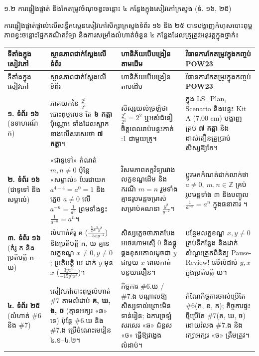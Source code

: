 \documentclass[a4paper,12pt]{article}
\newcommand{\en}[1]{{\TimesEn #1}}
\newcommand{\enbf}[1]{{\TimesEn\bfseries #1}}
\newcommand{\cnum}[1]{{\fontsize{11pt}{13pt}\selectfont\ding{\numexpr181+#1\relax}}\hspace{0.15em}}
\newcommand{\tblhead}[1]{{\linespread{1.0}\muol\fontsize{10.2pt}{16pt}\selectfont #1\par}}
\newcommand{\subsec}[1]{%
  \Needspace{1.7cm}%
  \par\vspace{6pt}%
  {\linespread{1.0}\muol\fontsize{11.5pt}{18.5pt}\selectfont #1}%
  \par\vspace{2pt}%
}
\begin{document}
\subsec{១.២ ការផ្ទៀងផ្ទាត់ និងកែតម្រូវចំណុចខ្វះចន្លោះ ៤ កន្លែងក្នុងសៀវភៅក្រសួង (ទំ. ១៦, ២៥)}
ការផ្ទៀងផ្ទាត់ផ្ទាល់លើសន្លឹកស្កេនសៀវភៅសិក្សាក្រសួងទំព័រ ១៦ និង ២៥ បានបង្ហាញកំហុសបោះពុម្ព ភាពខ្វះចន្លោះផ្នែកគណិតវិទ្យា និងការសម្រាំងលំហាត់ចំនួន ៤ កន្លែងដែលគ្រូត្រូវអនុវត្តក្នុងថ្នាក់៖

{\linespread{1.0}\fontsize{10.2pt}{15.5pt}\selectfont
\renewcommand{\arraystretch}{1.20}
\begin{longtable}{|L{2.80cm}|L{4.80cm}|L{4.65cm}|L{4.60cm}|}
\hline
{}
\tblhead{ទីតាំងក្នុងសៀវភៅ} & \tblhead{ស្ថានភាពជាក់ស្ដែងលើទំព័រ} & \tblhead{ហានិភ័យបើបង្រៀនតាមដើម} & \tblhead{វិធានការកែតម្រូវក្នុងកញ្ចប់ \enbf{POW23}} \\
\hline
\endfirsthead
\hline
{}
\tblhead{ទីតាំងក្នុងសៀវភៅ} & \tblhead{ស្ថានភាពជាក់ស្ដែងលើទំព័រ} & \tblhead{ហានិភ័យបើបង្រៀនតាមដើម} & \tblhead{វិធានការកែតម្រូវក្នុងកញ្ចប់ \enbf{POW23}} \\
\hline
\endhead
\textbf{១. ទំព័រ ១៦} (ឧទាហរណ៍ ក) & ភាគយកនៃ $\frac{2^7}{2^4}$ បោះពុម្ពលេខ \en{2} តែ \textbf{៦ កត្តា} ប៉ុណ្ណោះ ទាំងដែលស្លាកខាងលើសរសេរថា \textbf{៧ កត្តា}។ & សិស្សយល់ច្រឡំថា $\frac{2^7}{2^4}=2^2$ ឬអស់ជំនឿចិត្តពេលរាប់បន្ទះកាត់ \en{1:1} ជាមួយគ្រូ។ & ក្នុង \en{LS\_Plan}, \en{Scenario} និងបន្ទះ \en{Kit A (7.00 cm)} បង្ហាញគ្រប់ \textbf{៧ កត្តា} និងដាស់តឿនគ្រូប្រាប់សិស្សឱ្យកែ។ \\
\hline
\textbf{២. ទំព័រ ១៦} (ជាទូទៅ និង សម្គាល់) & «ជាទូទៅ» កំណត់ $m,n\neq 0$ ប៉ុន្តែ «សម្គាល់» បែរជាយក $a^{4-4}=a^0=1$ និងភ្លេច $a\neq 0$ លើ $a^{-n}=\frac{1}{a^n}$ ព្រមទាំងខ្វះ $\frac{1}{a^{-n}}=a^n$។ & វិសមភាពតក្កវិទ្យារវាងលក្ខខណ្ឌដើម និងករណី $m=n$ រួមទាំងគ្មានរូបមន្តចម្រាស់សម្រាប់គណនា $\frac{y^8}{y^{-2}}$។ & ប្ដូរមកកំណត់ជាក់លាក់ថា $a\neq 0,\ m,n\in\mathbb{Z}$ គ្រប់រូបមន្តទាំង ៣ និងបញ្ចូល $\frac{1}{a^{-n}}=a^n$ ក្នុងធនាគារ \cnum{3}។ \\
\hline
\textbf{៣. ទំព័រ ១៦} (គំរូ គ និង ប្រតិបត្តិ ក--ឃ) & លំហាត់គំរូ គ ($\frac{\frac{5}{4}x^3y^8}{-5xy^{-2}}$) និងប្រតិបត្តិ ក, ឃ គ្មានលក្ខខណ្ឌ $x\neq 0, y\neq 0$; ប្រតិបត្តិ ឃ ដាក់ $y$ មុន $x$ ($\frac{3yx^9}{-15y^5x^4}$)។ & សិស្សភ្លេចថាភាគបែងអថេរហាមស្មើ $0$ និងផ្គូផ្គងខុសគោលដូចជា $y$ ជាមួយ $x$ ពេលកាត់បន្ទយលឿន។ & បន្ថែមលក្ខខណ្ឌ $x,y\neq 0$ គ្រប់ទីកន្លែង និងដាក់សំណួរត្រួតពិនិត្យ \en{Pause-Review!} លើលំដាប់ $y,x$ ក្នុងប្រតិបត្តិ ឃ។ \\
\hline
\textbf{៤. ទំព័រ ២៥} (លំហាត់ \en{\#6} និង \en{\#7}) & សៀវភៅបោះពុម្ពលំហាត់ \en{\#7} តាមលំដាប់ \textbf{គ, ឃ, ង, ច} (គ្មានអក្សរ «ឆ» ទេ) ប៉ុន្តែ \en{\#6.}ឃ និង \en{\#7.}ង ប្រើចំណេះមេរៀន ៤.១--៤.២។ & កិច្ចការ \en{\#6.}ឃ \en{/} \en{\#7.}ង បណ្ដាលឱ្យសិស្សទាល់ព្រោះមិនទាន់រៀន; ឯការច្រឡំសរសេរ «ឆ» ជំនួស «ច» ធ្វើឱ្យវង្វេងលំដាប់។ & កំណែកិច្ចការចាស់ប្រើតែ \en{\#6(}ក, ខ, គ\en{)}; កិច្ចការផ្ទះថ្មីប្រើតែ \en{\#7(}គ, ឃ, ច\en{)} ដោយរំលង \en{\#7.}ង និងរក្សាអក្សរ «ច» ត្រឹមត្រូវ។ \\
\hline
\end{longtable}}
\end{document}
